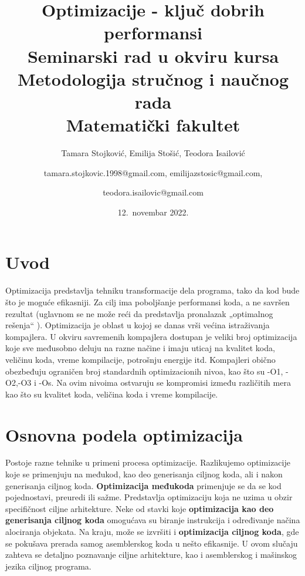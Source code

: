 \documentclass[a4paper]{article}
\begin{document}
\title{Optimizacije - ključ dobrih performansi\\ \small{Seminarski rad u okviru kursa\\Metodologija stručnog i naučnog rada\\ Matematički fakultet}}
\author{Tamara Stojković, Emilija Stošić, Teodora Isailović \and tamara.stojkovic.1998@gmail.com, emilijazstosic@gmail.com, \and teodora.isailovic@gmail.com}
\date{12.~novembar 2022.}

\maketitle

\tableofcontents

\newpage

\section{Uvod}
\label{sec:uvod}
Optimizacija predstavlja tehniku transformacije dela programa,  tako da kod bude što je moguće efikasniji. 
Za cilj ima poboljšanje performansi koda, a ne savršen rezultat (uglavnom se ne može reći da predstavlja pronalazak „optimalnog rešenja“ ). 
Optimizacija je oblast u kojoj se danas vrši većina istraživanja kompajlera. 
U okviru savremenih kompajlera dostupan je veliki broj optimizacija koje sve međusobno deluju na razne načine i imaju uticaj na kvalitet koda, veličinu koda, vreme kompilacije, potrošnju energije itd. 
Kompajleri obično obezbeđuju ograničen broj  standardnih optimizacionih nivoa, kao što su -O1, -O2,-O3 i -Os. Na ovim nivoima ostvaruju se kompromisi između  različitih mera kao što su kvalitet koda, veličina koda i vreme kompilacije. \cite{uvod}

\section{Osnovna podela optimizacija}
\label{sec:podela}
Postoje razne tehnike u primeni procesa optimizacije. Razlikujemo optimizacije koje se primenjuju na međukod,  kao deo generisanja ciljnog koda, ali i nakon generisanja ciljnog koda.
\textbf{Optimizacija međukoda} primenjuje se da se kod pojednostavi, preuredi ili sažme. Predstavlja optimizaciju koja ne uzima u obzir specifičnost ciljne arhitekture.
Neke od stavki koje \textbf{optimizacija kao deo generisanja ciljnog koda} omogućava su biranje instrukcija i određivanje načina alociranja objekata. Na kraju, može se izvršiti i \textbf{optimizacija ciljnog koda}, gde se pokušava prerada samog asemblerskog koda u nešto efikasnije. 
U ovom slučaju zahteva se deta\-ljno poznavanje ciljne arhitekture, kao i asemblerskog i mašinskog jezika ciljnog programa. \cite{osnovnaPodela}
\end{document}
